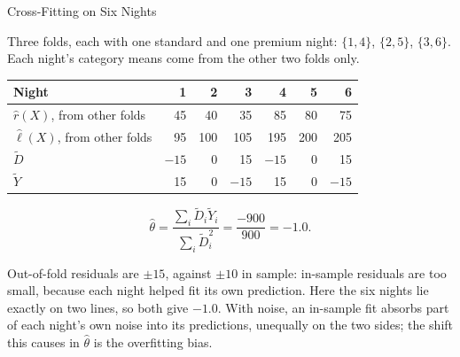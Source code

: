 \documentclass[aspectratio=169, 11pt, handout]{beamer}
\begin{document}
\begin{frame}{Cross-Fitting on Six Nights}

Three folds, each with one standard and one premium night: $\{1, 4\}$, $\{2, 5\}$, $\{3, 6\}$. Each night's category means come from the other two folds only.

\begin{center}
\small
\begin{tabular}{lrrrrrr}
\toprule
Night & 1 & 2 & 3 & 4 & 5 & 6 \\
\midrule
$\hat r(X)$, from other folds & 45 & 40 & 35 & 85 & 80 & 75 \\
$\hat\ell(X)$, from other folds & 95 & 100 & 105 & 195 & 200 & 205 \\
\midrule
$\tilde D$ & $-15$ & 0 & 15 & $-15$ & 0 & 15 \\
$\tilde Y$ & 15 & 0 & $-15$ & 15 & 0 & $-15$ \\
\bottomrule
\end{tabular}
\end{center}

\[
\hat\theta = \frac{\sum_i \tilde D_i \tilde Y_i}{\sum_i \tilde D_i^2} = \frac{-900}{900} = -1.0 .
\]

\medskip

Out-of-fold residuals are $\pm 15$, against $\pm 10$ in sample: in-sample residuals are too small, because each night helped fit its own prediction. Here the six nights lie exactly on two lines, so both give $-1.0$. With noise, an in-sample fit absorbs part of each night's own noise into its predictions, unequally on the two sides; the shift this causes in $\hat\theta$ is the overfitting bias.
\end{frame}
\end{document}
